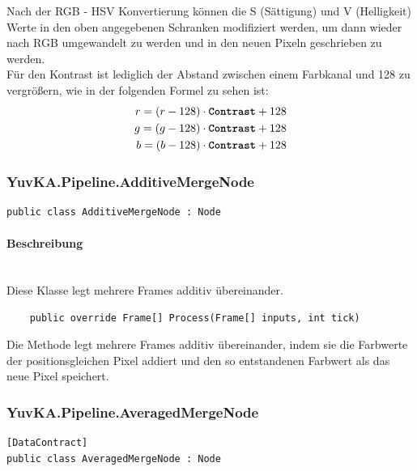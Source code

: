 \begin{itemize}
	Nach der RGB - HSV Konvertierung können die S (Sättigung) und V (Helligkeit) Werte in den oben angegebenen Schranken modifiziert werden, um dann wieder nach RGB umgewandelt zu werden und in den neuen Pixeln geschrieben zu werden. \\
	Für den Kontrast ist lediglich der Abstand zwischen einem Farbkanal und 128 zu vergrößern, wie in der folgenden Formel zu sehen ist: \begin{eqnarray*}
   r = (r - 128) \cdot \text{\textbf{\texttt{Contrast}}} + 128 \\
	g = (g - 128) \cdot \text{\textbf{\texttt{Contrast}}} + 128 \\
	b = (b - 128) \cdot \text{\textbf{\texttt{Contrast}}} + 128
\end{eqnarray*}

\end{itemize}

\subsubsection{YuvKA.Pipeline.AdditiveMergeNode}

\begin{verbatim}
public class AdditiveMergeNode : Node
\end{verbatim}

\paragraph{Beschreibung}~\\
Diese Klasse  legt mehrere Frames additiv übereinander.

\begin{itemize}

\begin{verbatim}
	public override Frame[] Process(Frame[] inputs, int tick)
\end{verbatim}
Die Methode  legt mehrere Frames additiv übereinander, indem sie die Farbwerte der positionsgleichen Pixel addiert und den so entstandenen Farbwert als das neue Pixel speichert.
\end{itemize}

\subsubsection{YuvKA.Pipeline.AveragedMergeNode}

\begin{verbatim}
[DataContract]
public class AveragedMergeNode : Node
\end{verbatim}

